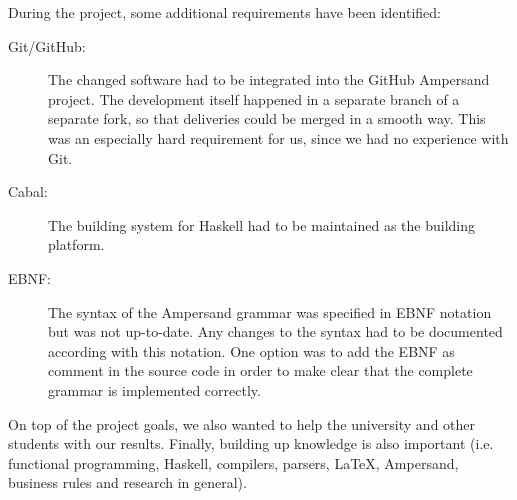 During the project, some additional requirements have been identified:
\begin{description}
  \item [Git/GitHub:] The changed software had to be integrated into the GitHub Ampersand project.
    The development itself happened in a separate branch of a separate fork, so that deliveries could be merged in a smooth way.
    This was an especially hard requirement for us, since we had no experience with Git.
  \item [Cabal:] The building system for Haskell had to be maintained as the building platform.
  \item [EBNF:] The syntax of the Ampersand grammar was specified in EBNF notation but was not up-to-date.
    Any changes to the syntax had to be documented according with this notation.
    One option was to add the EBNF as comment in the source code in order to make clear that the complete grammar is implemented correctly.
\end{description}

On top of the project goals, we also wanted to help the university and other students with our results.
Finally, building up knowledge is also important (i.e. functional programming, Haskell, compilers, parsers, LaTeX, Ampersand, business rules and research in general).

